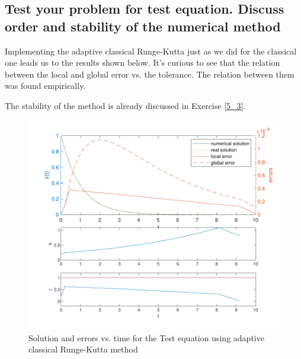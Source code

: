 \subsection{Test your problem for test equation. Discuss order and stability of the numerical method}
Implementing the adaptive classical Runge-Kutta just as we did for the classical one leads us to the results shown below. It's curious to see that the relation between the local and global error vs. the tolerance. The relation between them was found empirically.

The stability of the method is already discussed in Exercise \ref{5_3}.

\begin{figure}[H]
    \centering
    \includegraphics[width=0.7\linewidth]{images/6/6_3_TestEquation.pdf} 
    \caption{Solution and errors vs. time for the Test equation using adaptive classical Runge-Kutta method}
    \label{6_3_TE}
\end{figure}

